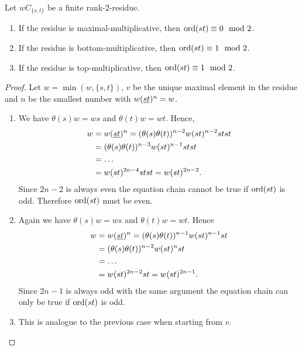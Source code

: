 \begin{lemm}
	Let $wC_{\{s,t\}}$ be a finite rank-2-residue.
	\begin{enumerate}
		\item If the residue is maximal-multiplicative, then $\operatorname{ord}(st) \equiv 0 \mod 2$.
		\item If the residue is bottom-multiplicative, then $\operatorname{ord}(st) \equiv 1 \mod 2$.
		\item If the residue is top-multiplicative, then $\operatorname{ord}(st) \equiv 1 \mod 2$. 
	\end{enumerate}

	\begin{proof}
		Let $w = \min(w, \{s,t\})$, $v$ be the unique maximal element in the residue and $n$ be the smallest number with $w(\underline{s} \underline{t})^n = w$.
		\begin{enumerate}
			\item We have $\theta(s)w = ws$ and $\theta(t)w = wt$. Hence,
			\begin{align*}
				w & = w(\underline{s} \underline{t})^n = (\theta(s)\theta(t))^{n-2} w (st)^{n-2} stst \\
				  & = (\theta(s)\theta(t))^{n-3} w (st)^{n-1} stst \\
				  & = \ldots \\
				  & = w (st)^{2n-4} stst = w (st)^{2n-2}.
			\end{align*}
			Since $2n-2$ is always even the equation chain cannot be true if $\operatorname{ord}(st)$ is odd. Therefore $\operatorname{ord}(st)$ must be even.
			\item Again we have $\theta(s)w = ws$ and $\theta(t)w = wt$. Hence
			\begin{align*}
				w & = w(\underline{s} \underline{t})^n = (\theta(s)\theta(t))^{n-1} w (st)^{n-1} st \\
				  & = (\theta(s)\theta(t))^{n-2} w (st)^{n} st \\
				  & = \ldots \\
				  & = w (st)^{2n-2} st = w (st)^{2n-1}.
			\end{align*}
			Since $2n-1$ is always odd with the same argument the equation chain can only be true if $\operatorname{ord}(st)$ is odd.
			\item This is analogue to the previous case when starting from $v$. \qedhere
		\end{enumerate}
	\end{proof}
\end{lemm}

